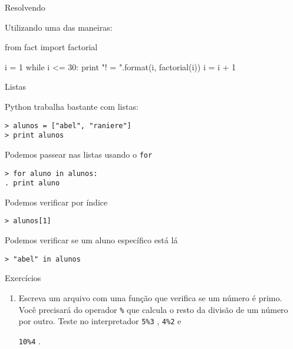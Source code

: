 \documentclass[12pt]{article}
\newcommand{\iframe}[1]{
\Large
\begin{center}
#1
\end{center}
}
\newcommand{\iframeend}{ \vfill \newpage}
\newcommand{\aframe}[1]{
\Large
\begin{center}
#1
\end{center}
\vfill
\newpage
}
\newcommand{\tit}[1]{
{\LARGE \color{green} #1}
\\ \vspace{0.5cm}
\vfill
}
\newcommand{\cmdpy}[1]{
\begin{flushleft}
{\color{yellow} \tt > #1 }\\
\end{flushleft}
}
\newcommand{\inline}[1]{
{\color{yellow} \tt #1} }
\begin{document}
\iframe{
  \tit{Resolvendo}
  Utilizando uma das maneiras:
}
\begin{file}
from fact import factorial

i = 1
while i <= 30:
  print "{}! = {}".format(i, factorial(i))
  i = i + 1
\end{file}
\iframeend

\aframe{
  \tit{Listas}
  Python trabalha bastante com listas:
  \cmdpy{alunos = ["abel", "raniere"] \\
  > print alunos}
  Podemos passear nas listas usando o \inline{for}
  \cmdpy{for aluno in alunos: \\
  . \qquad print aluno}
  Podemos verificar por índice
  \cmdpy{alunos[1]}
  Podemos verificar se um aluno específico está lá
  \cmdpy{"abel" in alunos}
}

\aframe{
  \tit{Exercícios}
  \begin{enumerate}
    \item Escreva um arquivo com uma função que verifica se um número é primo.
      Você precisará do operador \inline{\%} que calcula o resto da divisão de
      um número por outro. Teste no interpretador \inline{5\%3}, \inline{4\%2} e
      \inline{10\%4}.
  \end{enumerate}
}
\end{document}
